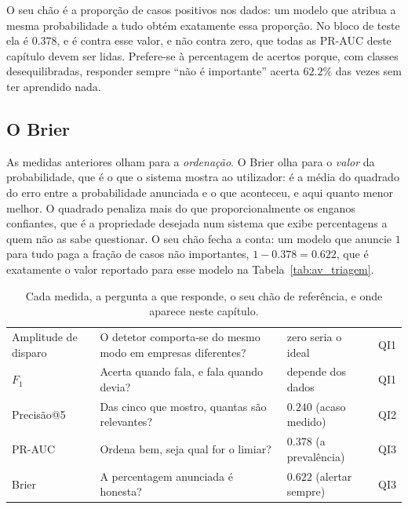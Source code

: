 O seu chão é a proporção de casos positivos nos dados: um modelo que atribua a mesma probabilidade
a tudo obtém exatamente essa proporção. No bloco de teste ela é $0.378$, e é contra esse valor, e
não contra zero, que todas as PR-AUC deste capítulo devem ser lidas. Prefere-se à percentagem de
acertos porque, com classes desequilibradas, responder sempre ``não é importante'' acerta $62.2\%$
das vezes sem ter aprendido nada.

\subsection{O Brier}
\label{sec:av_brier}

As medidas anteriores olham para a \emph{ordenação}. O Brier olha para o \emph{valor} da
probabilidade, que é o que o sistema mostra ao utilizador: é a média do quadrado do erro entre a
probabilidade anunciada e o que aconteceu, e aqui quanto menor melhor. O quadrado penaliza mais do
que proporcionalmente os enganos confiantes, que é a propriedade desejada num sistema que exibe
percentagens a quem não as sabe questionar. O seu chão fecha a conta: um modelo que anuncie $1$
para tudo paga a fração de casos não importantes, $1 - 0.378 = 0.622$, que é exatamente o valor
reportado para esse modelo na Tabela~\ref{tab:av_triagem}.

\begin{table}[ht]
\caption[As medidas usadas e o que cada uma responde]{Cada medida, a pergunta a que responde, o seu
chão de referência, e onde aparece neste capítulo.}
\label{tab:av_metricas}
\centering
\small
\begin{tabular}{L{0.15\textwidth} L{0.34\textwidth} L{0.20\textwidth} C{0.13\textwidth}}
\toprule
{} &  &  &  \\
\midrule
Amplitude de disparo & O detetor comporta-se do mesmo modo em empresas diferentes? & zero seria o
ideal & \gls{QI}1 \\
\addlinespace
$F_1$ & Acerta quando fala, e fala quando devia? & depende dos dados & \gls{QI}1 \\
\addlinespace
Precisão@5 & Das cinco que mostro, quantas são relevantes? & $0.240$ (acaso medido) & \gls{QI}2 \\
\addlinespace
PR-AUC & Ordena bem, seja qual for o limiar? & $0.378$ (a prevalência) & \gls{QI}3 \\
\addlinespace
Brier & A percentagem anunciada é honesta? & $0.622$ (alertar sempre) & \gls{QI}3 \\
\bottomrule
\end{tabular}
\end{table}

